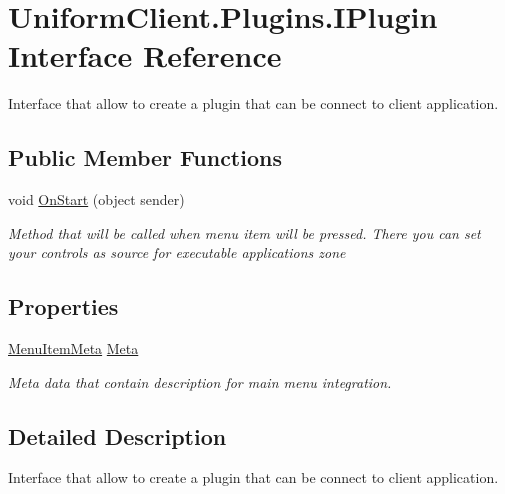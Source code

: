 \hypertarget{interface_uniform_client_1_1_plugins_1_1_i_plugin}{}\section{Uniform\+Client.\+Plugins.\+I\+Plugin Interface Reference}
\label{interface_uniform_client_1_1_plugins_1_1_i_plugin}


Interface that allow to create a plugin that can be connect to client application.  


\subsection*{Public Member Functions}
\begin{DoxyCompactItemize}
\item 
void \mbox{\hyperlink{interface_uniform_client_1_1_plugins_1_1_i_plugin_a1ca2220c7ce4a23f8f41af10efccf328}{On\+Start}} (object sender)
\begin{DoxyCompactList}\small\item\em Method that will be called when menu item will be pressed. There you can set your controls as source for executable application\textquotesingle{}s zone \end{DoxyCompactList}\end{DoxyCompactItemize}
\subsection*{Properties}
\begin{DoxyCompactItemize}
\item 
\mbox{\hyperlink{class_uniform_client_1_1_plugins_1_1_menu_item_meta}{Menu\+Item\+Meta}} \mbox{\hyperlink{interface_uniform_client_1_1_plugins_1_1_i_plugin_aa49e267e66a3d697ded460d9281dcc3a}{Meta}}
\begin{DoxyCompactList}\small\item\em Meta data that contain description for main menu integration. \end{DoxyCompactList}\end{DoxyCompactItemize}


\subsection{Detailed Description}
Interface that allow to create a plugin that can be connect to client application. 



